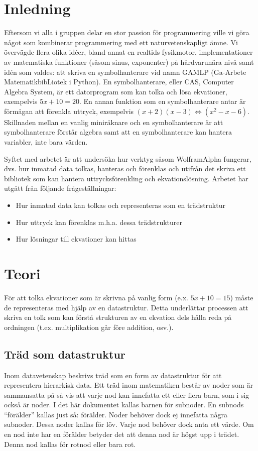 \documentclass[12pt,a4paper]{article}
\begin{document}
\section{Inledning}
Eftersom vi alla i gruppen delar en stor passion för programmering ville vi göra något som kombinerar programmering med ett naturvetenskapligt ämne. Vi övervägde flera olika idéer, bland annat en realtids fysikmotor, implementationer av matematiska funktioner (såsom sinus, exponenter) på hårdvarunära nivå samt idén som valdes: att skriva en symbolhanterare vid namn GAMLP (Ga-Arbete MatematikbibLiotek i Python). En symbolhanterare, eller CAS, Computer Algebra System, är ett datorprogram som kan tolka och lösa ekvationer, exempelvis \(5x + 10 = 20\). En annan funktion som en symbolhanterare antar är förmågan att förenkla uttryck, exempelvis \((x + 2)(x - 3) \Leftrightarrow (x^{2} - x - 6)\). Skillnaden mellan en vanlig miniräknare och en symbolhanterare är att symbolhanterare förstår algebra samt att en symbolhanterare kan hantera variabler, inte bara värden. 
\par
Syftet med arbetet är att undersöka hur verktyg såsom WolframAlpha fungerar, dvs. hur inmatad data tolkas, hanteras och förenklas och utifrån det skriva ett bibliotek som kan hantera uttrycksförenkling och ekvationslösning. Arbetet har utgått från följande frågeställningar:
\begin{itemize}
	\item Hur inmatad data kan tolkas och representeras som en trädstruktur
	\item Hur uttryck kan förenklas m.h.a. dessa trädstrukturer
	\item Hur lösningar till ekvationer kan hittas
\end{itemize}
\section{Teori}
För att tolka ekvationer som är skrivna på vanlig form (e.x. \(5x + 10 = 15\)) måste de representeras med hjälp av en datastruktur. Detta underlättar processen att skriva en tolk som kan förstå strukturen av en ekvation dels hålla reda på ordningen (t.ex. multiplikation går före addition, osv.).
\subsection{Träd som datastruktur}
\label{subsec:trees}
Inom datavetenskap beskrivs träd som en form av datastruktur för att representera hierarkisk data. Ett träd inom matematiken består av noder som är sammansatta på så vis att varje nod kan innefatta ett eller flera barn, som i sig också är noder. I det här dokumentet kallas barnen för subnoder. En subnods ``förälder'' kallas just så: förälder. Noder behöver dock ej innefatta några subnoder. Dessa noder kallas för löv. Varje nod behöver dock anta ett värde. Om en nod inte har en förälder betyder det att denna nod är högst upp i trädet. Denna nod kallas för rotnod eller bara rot.
\end{document}
